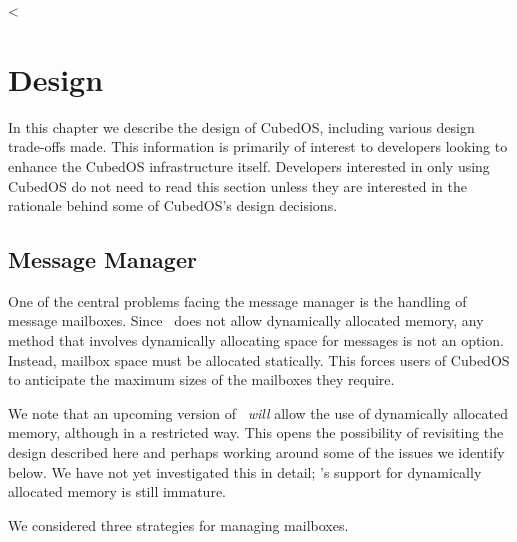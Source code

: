 <
\chapter{Design}
\label{chapt:design}

In this chapter we describe the design of CubedOS, including various design trade-offs made.
This information is primarily of interest to developers looking to enhance the CubedOS
infrastructure itself. Developers interested in only using CubedOS do not need to read this
section unless they are interested in the rationale behind some of CubedOS's design decisions.

\section{Message Manager}
\label{sec:design-message-manager}

One of the central problems facing the message manager is the handling of message mailboxes.
Since \SPARK\ does not allow dynamically allocated memory, any method that involves dynamically
allocating space for messages is not an option. Instead, mailbox space must be allocated
statically. This forces users of CubedOS to anticipate the maximum sizes of the mailboxes they
require.

We note that an upcoming version of \SPARK\ \emph{will} allow the use of dynamically allocated
memory, although in a restricted way. This opens the possibility of revisiting the design
described here and perhaps working around some of the issues we identify below. We have not yet
investigated this in detail; \SPARK's support for dynamically allocated memory is still
immature.

We considered three strategies for managing mailboxes.

